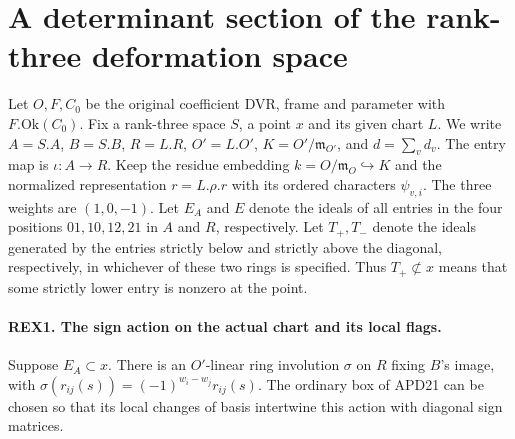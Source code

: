 \section{A determinant section of the rank-three deformation space}

Let \(O,F,C_0\) be the original coefficient DVR, frame and parameter
with \(F.\mathrm{Ok}(C_0)\). Fix a rank-three space \(S\), a point \(x\)
and its given chart \(L\). We write \(A=S.A\), \(B=S.B\), \(R=L.R\),
\(O'=L.O'\), \(K=O'/\mathfrak m_{O'}\), and \(d=\sum_v d_v\).
The entry map is \(\iota:A\to R\). Keep the residue embedding
\(k=O/\mathfrak m_O\hookrightarrow K\) and the normalized representation
\(r=L.\rho.r\) with its ordered characters \(\psi_{v,i}\).
The three weights are \((1,0,-1)\). Let \(E_A\) and \(E\) denote the
ideals of all entries in the four positions \(01,10,12,21\) in \(A\)
and \(R\), respectively. Let \(T_+,T_-\) denote the ideals generated
by the entries strictly below and strictly above the diagonal, respectively,
in whichever of these two rings is specified. Thus \(T_+\not\subset x\)
means that some strictly lower entry is nonzero at the point.

\paragraph{REX1. The sign action on the actual chart and its local flags.}
\label{claim:REX1}
Suppose \(E_A\subset x\). There is an \(O'\)-linear ring involution
\(\sigma\) on \(R\) fixing \(B\)'s image, with
\(\sigma(r_{ij}(s))=(-1)^{w_i-w_j}r_{ij}(s)\).
The ordinary box of APD21 can be chosen so that its local changes of
basis intertwine this action with diagonal sign matrices.

